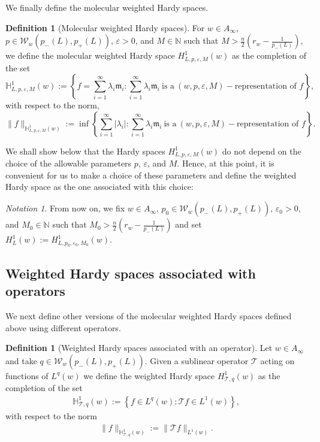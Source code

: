 \documentclass[11pt, a4paper,leqno]{amsart}
\newcommand{\mm}{\mathfrak{m}}
\theoremstyle{plain}
\theoremstyle{definition}
\newtheorem{definition}[equation]{Definition}
\theoremstyle{remark}
\newtheorem{notation}[equation]{Notation}
\numberwithin{equation}{section}
\def \N{ \mathbb{N} }
\def \p{ (w,p,\varepsilon,M)-\textrm{representation}}
\begin{document}
We finally define the molecular weighted Hardy spaces.
%
\begin{definition}[Molecular weighted Hardy spaces]
For $w\in A_{\infty}$, $p\in \mathcal{W}_w(p_-(L),p_+(L))$, $\varepsilon>0$, and $M\in \N$ such that $M>\frac{n}{2}\left(r_w-\frac{1}{p_-(L)}\right)$, we
define the molecular weighted Hardy space $H^1_{L,p,\varepsilon,M}(w)$  as the completion of the set
$$
\mathbb{H}_{L,p,\varepsilon,M}^1(w):=\left\{f=\sum_{i=1}^{\infty}\lambda_i\mm_i
: \sum_{i=1}^{\infty}\lambda_i\mm_i \ \textrm{is a} \ \p\textrm{ of }f\right\},
$$
with respect to the norm,
$$
\|f\|_{\mathbb{H}_{L,p,\varepsilon,M}^1(w)}:=\inf\left\{\sum_{i=1}^{\infty}|\lambda_i|:
\sum_{i=1}^{\infty}\lambda_i\mm_i \ \textrm{is a} \ \p\textrm{ of }f\right\}.
$$
\end{definition}


We shall show below that the Hardy spaces $H^1_{L,p,\varepsilon,M}(w)$ do not depend on the choice of the allowable parameters $p$, $\varepsilon$, and $M$. Hence, at this point, it is convenient for us to make a choice of these parameters and define the weighted Hardy space as the one associated with this choice:

\begin{notation}\label{notation:H1w}
From now on, we fix $w\in A_{\infty}$, $p_0\in \mathcal{W}_w(p_-(L),p_+(L))$, $\varepsilon_0>0$, and $M_0\in \N$ such that $M_0>\frac{n}{2}\left(r_w-\frac{1}{p_-(L)}\right)$ and set $H_L^1(w):=H_{L,p_0,\varepsilon_0,M_0}^1(w)$.
\end{notation}


\subsection{Weighted Hardy spaces associated with operators}
%
%
We next define other versions of the molecular weighted Hardy spaces defined above using different operators.

\begin{definition}[Weighted Hardy spaces associated with an operator]
Let $w\in A_\infty$ and take $q\in \mathcal{W}_w(p_-(L),p_+(L))$. Given a sublinear operator $\mathcal{T}$  acting on functions of $L^q(w)$ 
we define the 
weighted Hardy space $H^{1}_{\mathcal{T},q}(w)$  as the completion of the set
\begin{align}\label{defw}
\mathbb{H}^{1}_{\mathcal{T},q}(w):=\left\{f\in L^{q}(w):\mathcal{T}f\in L^1(w)\right\},
\end{align}
with respect to the norm
 \begin{align}\label{defw2}
\|f\|_{\mathbb{H}^{1}_{\mathcal{T},q}(w)}:=\|\mathcal{T}f\|_{L^1(w)}.
\end{align}
\end{definition} 
\end{document}

